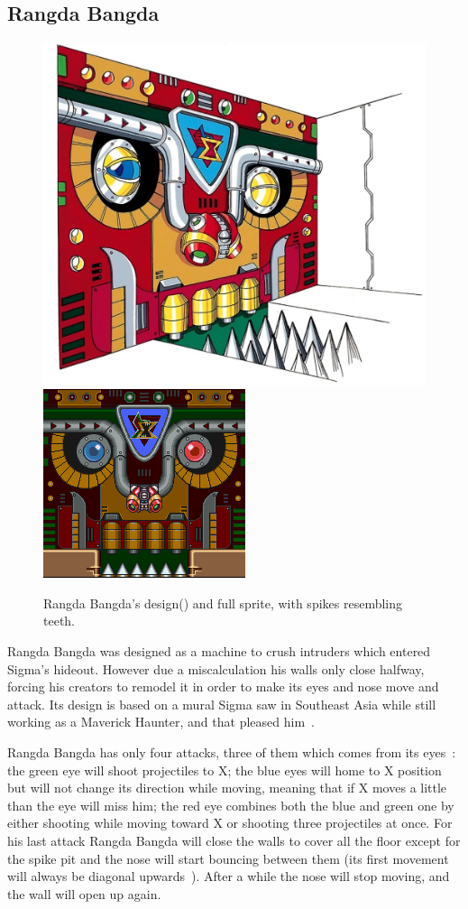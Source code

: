 \subsection{Rangda Bangda}\label{boss:Rangda_bangda}
\begin{figure}[htp]
	\centering
	\includegraphics[width=0.4\linewidth]{figures/X1/Sigma_stages/RangdaBangda.jpg}
	\includegraphics[width=0.35\linewidth]{figures/X1/Sigma_stages/Rangdabangdasprite.png}
	\caption{Rangda Bangda's design(\cite{book:MMX_Complete_art}) and full sprite, with spikes resembling teeth.}
\end{figure}
Rangda Bangda was designed as a machine to crush intruders which entered Sigma's hideout. However due a miscalculation his walls only close halfway, forcing his creators to remodel it in order to make its eyes and nose move and attack. Its design is based on a mural Sigma saw in Southeast Asia while still working as a Maverick Haunter, and that pleased him~\cite{wayback:X_resources}.

Rangda Bangda has only four attacks, three of them which comes from its eyes~\cite{wiki:Rangda_bangda}: the green eye will shoot projectiles to X; the blue eyes will home to X position but will not change its direction while moving, meaning that if X moves a little than the eye will miss him; the red eye combines both the blue and green one by either shooting while moving toward X or shooting three projectiles at once. For his last attack Rangda Bangda will close the walls to cover all the floor except for the spike pit and the nose will start bouncing between them (its first movement will always be diagonal upwards~\cite{stratwiki:Sigma_stage_2}). After a while the nose will stop moving, and the wall will open up again.

